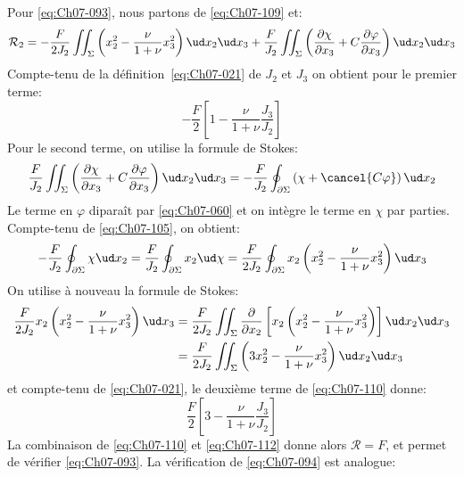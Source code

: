 Pour \eqref{eq:Ch07-093}, nous partons de \eqref{eq:Ch07-109} et: 
\begin{equation}
    \mathcal{R}_2 = - \frac{F}{2 J_2} \iint_{\Sigma} \left( x_2^2 - \frac{\nu}{1+\nu} x_3^2 \right) \ud x_2 \ud x_3 + \frac{F}{J_2} \iint_{\Sigma} \left( \frac{\partial \chi}{\partial x_3} + C \frac{\partial \varphi}{\partial x_3} \right) \ud x_2 \ud x_3
    \label{eq:Ch07-110}
\end{equation}
Compte-tenu de la définition~\eqref{eq:Ch07-021} de $J_2$ et $J_3$ on obtient pour le premier terme:
\begin{equation}
    -\frac{F}{2} \left[ 1 - \frac{\nu}{1+\nu} \frac{J_3}{J_2} \right]
    \label{eq:Ch07-111}
\end{equation}
Pour le second terme, on utilise la formule de Stokes:
\begin{displaymath}
    \frac{F}{J_2} \iint_{\Sigma} \left( \frac{\partial \chi}{\partial x_3} + C \frac{\partial \varphi}{\partial x_3} \right) \ud x_2 \ud x_3 = -\frac{F}{J_2} \oint_{\partial \Sigma} \left( \chi + \cancel{C\varphi} \right) \ud x_2
\end{displaymath}
Le terme en $\varphi$ diparaît par \eqref{eq:Ch07-060} et on intègre le terme en $\chi$ par parties.
Compte-tenu de \eqref{eq:Ch07-105}, on obtient:
\begin{displaymath}
    -\frac{F}{J_2} \oint_{\partial \Sigma} \chi \ud x_2 = \frac{F}{J_2} \oint_{\partial \Sigma} x_2 \ud \chi = \frac{F}{2J_2} \oint_{\partial \Sigma} x_2 \left( x_2^2 - \frac{\nu}{1+\nu}x_3^2 \right) \ud x_3
\end{displaymath}
On utilise à nouveau la formule de Stokes: 
\begin{align*}
    \frac{F}{2J_2} x_2 \left( x_2^2 - \frac{\nu}{1+\nu}x_3^2 \right) \ud x_3 &= \frac{F}{2J_2} \iint_{\Sigma} \frac{\partial}{\partial x_2} \left[ x_2 \left( x_2^2 - \frac{\nu}{1+\nu} x_3^2 \right) \right]\ud x_2 \ud x_3 \\
    &= \frac{F}{2J_2} \iint_{\Sigma} \left( 3x_2^2 - \frac{\nu}{1+\nu} x_3^2 \right)\ud x_2 \ud x_3
\end{align*}
et compte-tenu de \eqref{eq:Ch07-021}, le deuxième terme de \eqref{eq:Ch07-110} donne: 
\begin{equation}
    \frac{F}{2} \left[ 3 - \frac{\nu}{1+\nu} \frac{J_3}{J_2} \right]
    \label{eq:Ch07-112}
\end{equation}
La combinaison de \eqref{eq:Ch07-110} et \eqref{eq:Ch07-112} donne alors $\mathcal{R}=F$, et permet de vérifier \eqref{eq:Ch07-093}.
La vérification de \eqref{eq:Ch07-094} est analogue: 
